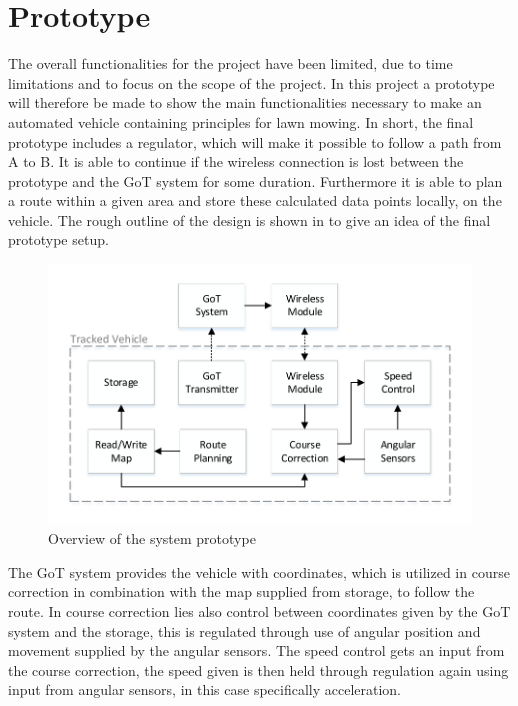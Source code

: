 \section{Prototype}
The overall functionalities for the project have been limited, due to time limitations and to focus on the scope of the project. In this project a prototype will therefore be made to show the main functionalities necessary to make an automated vehicle containing principles for lawn mowing.
In short, the final prototype includes a regulator, which will make it possible to follow a path from A to B. It is able to continue if the wireless connection is lost between the prototype and the GoT system for some duration. Furthermore it is able to plan a route within a given area and store these calculated data points locally, on the vehicle. The rough outline of the design is shown in  to give an idea of the final prototype setup.

\begin{figure}[H]
	\centering
	\includegraphics[scale=.9]{figures/systemOverview1}
	\caption{Overview of the system prototype}
	\label{fig:systemOverview1}
\end{figure}

The GoT system provides the vehicle with coordinates, which is utilized in course correction in combination with the map supplied from storage, to follow the route. In course correction lies also control between coordinates given by the GoT system and the storage, this is regulated through use of angular position and movement supplied by the angular sensors. The speed control gets an input from the course correction, the speed given is then held through regulation again using input from angular sensors, in this case specifically acceleration.

